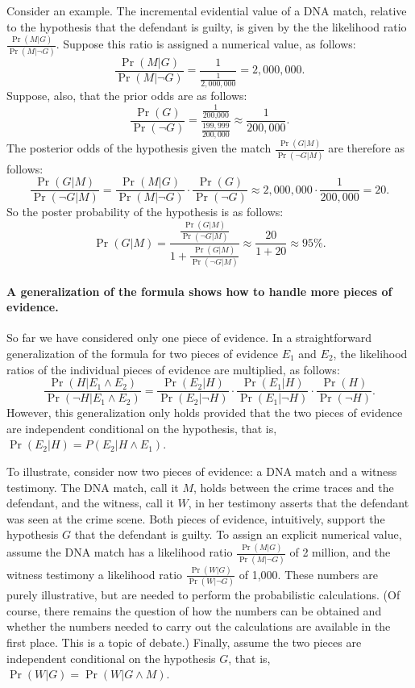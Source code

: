 \documentclass[10pt]{article}
\begin{document}
\noindent Consider an example. The incremental evidential value of a DNA match, relative to the hypothesis 
that the defendant is guilty, is given by the the likelihood ratio $\frac{\Pr(M |G)}{\Pr( M | \neg G)}$. 
Suppose this ratio is assigned a numerical value, as follows:
%
\[\frac{\Pr(M |G)}{\Pr( M | \neg G)}=\frac{1}{\frac{1}{2,000,000}}=2, 000,000.\]
% 
Suppose, also, that the prior odds are as follows:
%
\[\frac{\Pr(G)}{\Pr(\neg G)}=\frac{\frac{1}{\text{200,000}}}{\frac{199,999}{200,000}}\approx \frac{1}{200,000}.\]
% 
The posterior odds of the hypothesis given the match $\frac{\Pr(G|M)}{\Pr(\neg G|M)}$ are therefore as follows:
%
\[\frac{\Pr(G|M)}{\Pr(\neg G|M)}= \frac{\Pr(M |G)}{\Pr( M | \neg G)}\cdot \frac{\Pr(G)}{\Pr(\neg G)} \approx 2,000,000 \cdot \frac{1}{200,000}=20.\]
% 
So the poster probability of the hypothesis is as follows:
%
\[\Pr(G|M)= \frac{\frac{\Pr(G|M)}{\Pr(\neg G|M)}}{1+ \frac{\Pr(G|M)}{\Pr(\neg G|M)}} \approx \frac{20}{1+20}\approx 95\%.\]
%
 


\paragraph{A generalization of the formula shows 
how to handle more pieces of evidence.} 
So far we have considered only one piece of evidence. 
In a straightforward generalization of the formula for two pieces of evidence $E_1$ and $E_2$, the likelihood ratios of the individual pieces of evidence are multiplied, as follows:
	\[ \frac{\Pr(H|E_1 \land E_2)}{\Pr(\neg H | E_1 \land E_2)} = 
	\frac{\Pr(E_2 | H)}{\Pr(E_2| \neg H)}
	\cdot 
	\frac{\Pr(E_1 | H)}{\Pr(E_1| \neg H)}
	\cdot 
	\frac{\Pr(H)}{\Pr(\neg H)}.\]
However, this generalization only holds provided that the two pieces of evidence are 
independent conditional on the hypothesis, that is, $\Pr(E_2| H)=P(E_2| H \wedge E_1)$. 

To illustrate, consider now two pieces of evidence: a DNA match and a witness testimony.
The DNA match, call it $M$, holds between the crime traces and the defendant, and 
the witness, call it $W$, in her testimony asserts that the defendant was 
seen at the crime scene. 
Both pieces of evidence, intuitively, support the hypothesis $G$ that the defendant 
is guilty. To assign an explicit numerical value, assume
 the DNA match has a likelihood ratio $\frac{\Pr(M | G)}{\Pr( M | \neg G)}$ of 2 million, 
and the witness testimony a likelihood ratio $\frac{\Pr(W | G)}{\Pr( W | \neg G)}$ of 1,000. 
These numbers are purely illustrative, but are needed to perform the probabilistic calculations. (Of course, there remains the 
question of how the numbers can be obtained and whether the numbers 
needed to carry out the calculations are available in the first place. This is a topic of debate.) Finally, assume the two pieces are independent conditional on the hypothesis $G$, that is, 
$\Pr(W|G)=\Pr(W| G\wedge M)$. 
\end{document}

